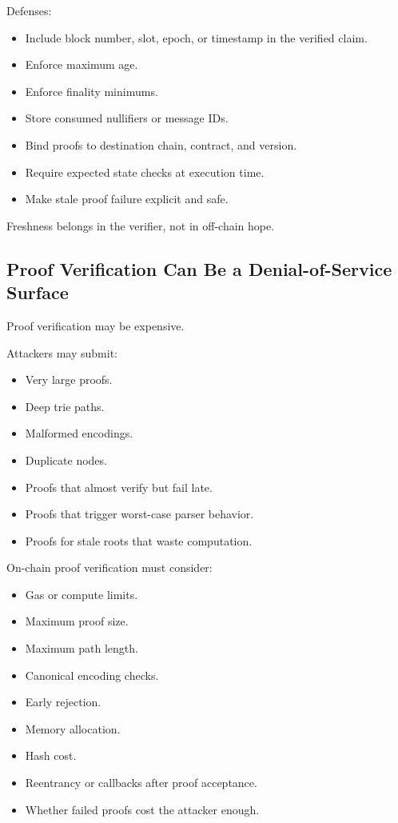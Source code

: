 Defenses:

\begin{itemize}
\tightlist
\item
  Include block number, slot, epoch, or timestamp in the verified claim.
\item
  Enforce maximum age.
\item
  Enforce finality minimums.
\item
  Store consumed nullifiers or message IDs.
\item
  Bind proofs to destination chain, contract, and version.
\item
  Require expected state checks at execution time.
\item
  Make stale proof failure explicit and safe.
\end{itemize}

Freshness belongs in the verifier, not in off-chain hope.

\subsection{Proof Verification Can Be a Denial-of-Service Surface}

Proof verification may be expensive.

Attackers may submit:

\begin{itemize}
\tightlist
\item
  Very large proofs.
\item
  Deep trie paths.
\item
  Malformed encodings.
\item
  Duplicate nodes.
\item
  Proofs that almost verify but fail late.
\item
  Proofs that trigger worst-case parser behavior.
\item
  Proofs for stale roots that waste computation.
\end{itemize}

On-chain proof verification must consider:

\begin{itemize}
\tightlist
\item
  Gas or compute limits.
\item
  Maximum proof size.
\item
  Maximum path length.
\item
  Canonical encoding checks.
\item
  Early rejection.
\item
  Memory allocation.
\item
  Hash cost.
\item
  Reentrancy or callbacks after proof acceptance.
\item
  Whether failed proofs cost the attacker enough.
\end{itemize}

